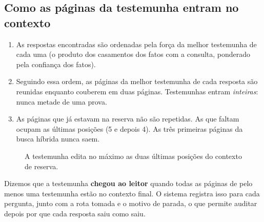 \documentclass[11pt]{article}
\begin{document}
\subsection{Como as páginas da testemunha entram no contexto}

\begin{enumerate}[nosep]
\item As respostas encontradas são ordenadas pela força da melhor
testemunha de cada uma (o produto dos casamentos dos fatos com a consulta,
ponderado pela confiança dos fatos).
\item Seguindo essa ordem, as páginas da melhor testemunha de cada resposta
são reunidas enquanto couberem em duas páginas. Testemunhas entram
\emph{inteiras}: nunca metade de uma prova.
\item As páginas que já estavam na reserva não são repetidas. As que
faltam ocupam as últimas posições (5 e depois 4). As três primeiras páginas
da busca híbrida nunca saem.
\end{enumerate}

\begin{figure}[h]
\centering
{}
\caption{A testemunha edita no máximo as duas últimas posições do contexto de
reserva.}
\label{fig:slots}
\end{figure}

Dizemos que a testemunha \textbf{chegou ao leitor} quando todas as páginas de
pelo menos uma testemunha estão no contexto final. O sistema registra isso
para cada pergunta, junto com a rota tomada e o motivo de parada, o que
permite auditar depois por que cada resposta saiu como saiu.
\end{document}
